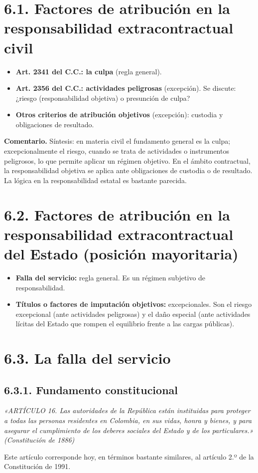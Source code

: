 
\section{6.1. Factores de atribución en la responsabilidad extracontractual civil}
\begin{itemize}
\item \textbf{Art. 2341 del C.C.: la culpa} (regla general).
\item \textbf{Art. 2356 del C.C.: actividades peligrosas} (excepción). Se discute: ¿riesgo (responsabilidad objetiva) o presunción de culpa?
\item \textbf{Otros criterios de atribución objetivos} (excepción): custodia y obligaciones de resultado.
\end{itemize}
\begin{comentario}
\textcolor[HTML]{8A6D3B}{\textbf{Comentario. }}Síntesis: en materia civil el fundamento general es la culpa; excepcionalmente el riesgo, cuando se trata de actividades o instrumentos peligrosos, lo que permite aplicar un régimen objetivo. En el ámbito contractual, la responsabilidad objetiva se aplica ante obligaciones de custodia o de resultado. La lógica en la responsabilidad estatal es bastante parecida.
\end{comentario}
\section{6.2. Factores de atribución en la responsabilidad extracontractual del Estado (posición mayoritaria)}
\begin{itemize}
\item \textbf{Falla del servicio:} regla general. Es un régimen subjetivo de responsabilidad.
\item \textbf{Títulos o factores de imputación objetivos:} excepcionales. Son el riesgo excepcional (ante actividades peligrosas) y el daño especial (ante actividades lícitas del Estado que rompen el equilibrio frente a las cargas públicas).
\end{itemize}
\section{6.3. La falla del servicio}
\subsection{6.3.1. Fundamento constitucional}
\begin{cita}
\textit{«ARTÍCULO 16. Las autoridades de la República están instituidas para proteger a todas las personas residentes en Colombia, en sus vidas, honra y bienes, y para asegurar el cumplimiento de los deberes sociales del Estado y de los particulares.» (Constitución de 1886)}
\end{cita}
Este artículo corresponde hoy, en términos bastante similares, al artículo 2.º de la Constitución de 1991.

